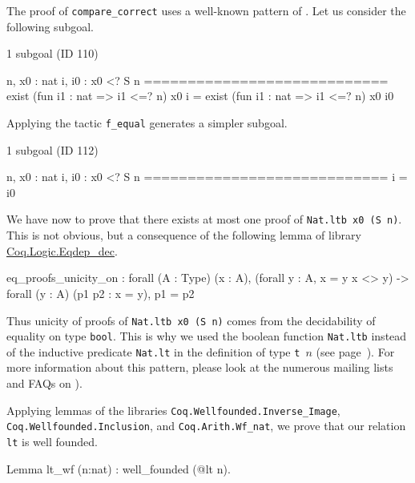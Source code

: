 \begin{remark}
 The proof of \texttt{compare\_correct} uses a well-known pattern of \coq{}.
Let us consider  the following subgoal.

\begin{Coqanswer}
 1 subgoal (ID 110)
  
  n, x0 : nat
  i, i0 : x0 <? S n
  ============================
  exist (fun i1 : nat => i1 <=? n) x0 i =
  exist (fun i1 : nat => i1 <=? n) x0 i0
\end{Coqanswer}

Applying the tactic \texttt{f\_equal} generates a simpler subgoal.

\begin{Coqanswer}
1 subgoal (ID 112)
  
  n, x0 : nat
  i, i0 : x0 <? S n
  ============================
  i = i0
\end{Coqanswer}

We have now to prove that there exists at most one  proof of \texttt{Nat.ltb x0 (S n)}. This is not obvious, but  a consequence of the following lemma of library 
\href{https://coq.inria.fr/distrib/current/stdlib/Coq.Logic.Eqdep_dec.html}{Coq.Logic.Eqdep\_dec}.

\label{sect:eq-proof-unicity}

\begin{Coqanswer}
eq_proofs_unicity_on :
forall (A : Type) (x : A),
(forall y : A, x = y \/ x <> y) -> forall (y : A) (p1 p2 : x = y), p1 = p2
\end{Coqanswer}

Thus unicity of proofs of \texttt{Nat.ltb x0 (S n)}  comes from the decidability of
equality on type \texttt{bool}.
This is why we used the boolean function \texttt{Nat.ltb} instead of the inductive predicate \texttt{Nat.lt} in the definition of type \texttt{t $n$} (see page~\pageref{def: Finite-ord-type}).
For more information about this pattern, please look at the numerous mailing lists and 
FAQs on \coq{}).



\end{remark}


Applying lemmas of the libraries \texttt{Coq.Wellfounded.Inverse\_Image}, \linebreak
 \texttt{Coq.Wellfounded.Inclusion}, and \texttt{Coq.Arith.Wf\_nat}, we prove that our
relation \texttt{lt} is well founded.

\begin{Coqsrc}
Lemma lt_wf (n:nat) : well_founded (@lt n).
\end{Coqsrc}

